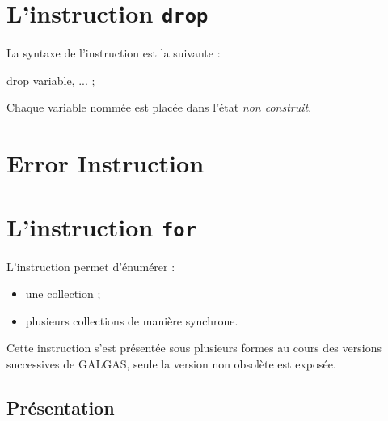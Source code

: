 





\section{L'instruction \texttt{drop}}

La syntaxe de l'instruction  est la suivante :
{
\begin{galgascode}
drop variable, ... ;
\end{galgascode}
}

Chaque variable nommée est placée dans l'état \emph{non construit}.

\section{Error Instruction}






\section{L'instruction \texttt{for}}
















L'instruction  permet d'énumérer :
\begin{itemize}
  \item une collection ;
  \item plusieurs collections de manière synchrone.
\end{itemize}

Cette instruction s'est présentée sous plusieurs formes au cours des versions successives de GALGAS, seule la version non obsolète est exposée.

\subsection{Présentation}

